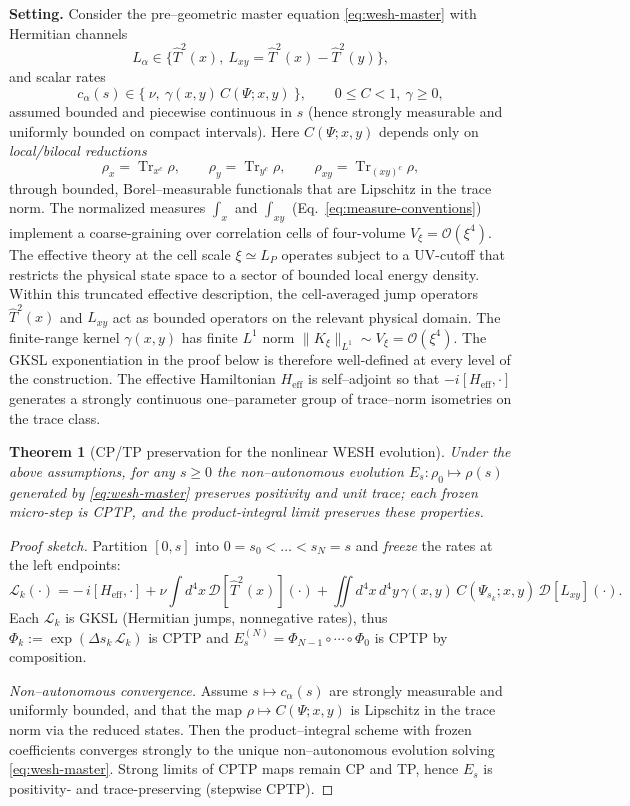 \documentclass[12pt,a4paper]{article}
\newtheorem{theorem}{Theorem}[section]
\renewcommand{\Tr}{\operatorname{Tr}}
\numberwithin{equation}{section}
\begin{document}
\vspace{0.5cm}
\noindent\textbf{Setting.}
Consider the pre–geometric master equation \eqref{eq:wesh-master} with Hermitian channels
\[
L_\alpha\in\big\{\hat T^2(x),\ L_{xy}=\hat T^2(x)-\hat T^2(y)\big\},
\]
and scalar rates
\[
c_\alpha(s)\in\{\ \nu,\ \gamma(x,y)\,C(\Psi;x,y)\ \},\qquad 0\le C<1,\ \gamma\ge0,
\]
assumed bounded and piecewise continuous in $s$ (hence strongly measurable and uniformly bounded on compact intervals). Here $C(\Psi;x,y)$ depends only on \emph{local/bilocal reductions}
\[
\rho_x=\Tr_{x^c}\rho,\qquad \rho_y=\Tr_{y^c}\rho,\qquad \rho_{xy}=\Tr_{(xy)^c}\rho,
\]
through bounded, Borel–measurable functionals that are Lipschitz in the trace norm. The normalized measures $\int_x$ and $\int_{xy}$ (Eq.~\eqref{eq:measure-conventions}) implement a coarse-graining over correlation cells of four-volume $V_\xi = \mathcal{O}(\xi^4)$. The effective theory at the cell scale $\xi \simeq L_P$ operates subject to a UV-cutoff that restricts the physical state space to a sector of bounded local energy density. Within this truncated effective description, the cell-averaged jump operators $\hat{T}^2(x)$ and $L_{xy}$ act as bounded operators on the relevant physical domain. The finite-range kernel $\gamma(x,y)$ has finite $L^1$ norm $\|K_\xi\|_{L^1} \sim V_\xi = \mathcal{O}(\xi^4)$. The GKSL exponentiation in the proof below is therefore well-defined at every level of the construction. The effective Hamiltonian $H_{\mathrm{eff}}$ is self–adjoint so that $-i[H_{\mathrm{eff}},\cdot]$ generates a strongly continuous one–parameter group of trace–norm isometries on the trace class.

\begin{theorem}[CP/TP preservation for the nonlinear WESH evolution]\label{thm:H-CPTP}
Under the above assumptions, for any $s\ge0$ the non–autonomous evolution $E_s:\rho_0\mapsto\rho(s)$ generated by \eqref{eq:wesh-master} preserves positivity and unit trace; each frozen micro-step is CPTP, and the product-integral limit preserves these properties.
\end{theorem}

\begin{proof}[Proof sketch]
Partition $[0,s]$ into $0=s_0<\dots<s_N=s$ and \emph{freeze} the rates at the left endpoints:
\[
\mathcal L_k(\cdot)=-\,i[H_{\mathrm{eff}},\cdot]+\nu\!\int d^4x\,\mathcal D[\hat T^2(x)](\cdot)
+\!\iint d^4x\,d^4y\,\gamma(x,y)\,C(\Psi_{s_k};x,y)\,\mathcal D[L_{xy}](\cdot).
\]
Each $\mathcal L_k$ is GKSL (Hermitian jumps, nonnegative rates), thus $\Phi_k:=\exp(\Delta s_k\,\mathcal L_k)$ is CPTP and $E_s^{(N)}=\Phi_{N-1}\circ\cdots\circ\Phi_0$ is CPTP by composition. 

\noindent\textit{Non–autonomous convergence.} 
Assume $s\mapsto c_\alpha(s)$ are strongly measurable and uniformly bounded, and that the map $\rho\mapsto C(\Psi;x,y)$ is Lipschitz in the trace norm via the reduced states. Then the product–integral scheme with frozen coefficients converges strongly to the unique non–autonomous evolution solving \eqref{eq:wesh-master}. Strong limits of CPTP maps remain CP and TP, hence $E_s$ is positivity- and trace-preserving (stepwise CPTP).
\end{proof}
\end{document}
